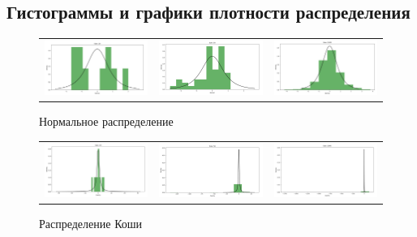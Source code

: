 \subsection{Гистограммы и графики плотности распределения}
\begin{figure}[H]
	\centering
	\begin{tabular}{ccc}
		\includegraphics[width=55mm, height =0.25\textheight]{pics/n10.jpg}
		&
		\includegraphics[width=55mm, height =0.25\textheight]{pics/n50.jpg}
		&
		\includegraphics[width=55mm, height =0.25\textheight]{pics/n1000.jpg}
	\end{tabular}
	\caption{Нормальное распределение}
	\label{fig:normal}
\end{figure}

\begin{figure}[H]
	\centering
	\begin{tabular}{ccc}
		\includegraphics[width=55mm, height =0.25\textheight]{pics/c10.jpg}
		&
		\includegraphics[width=55mm, height =0.25\textheight]{pics/c50.jpg}
		&
		\includegraphics[width=55mm, height =0.25\textheight]{pics/c1000.jpg}
	\end{tabular}
	\caption{Распределение Коши}
	\label{fig:cauchy}
\end{figure}


